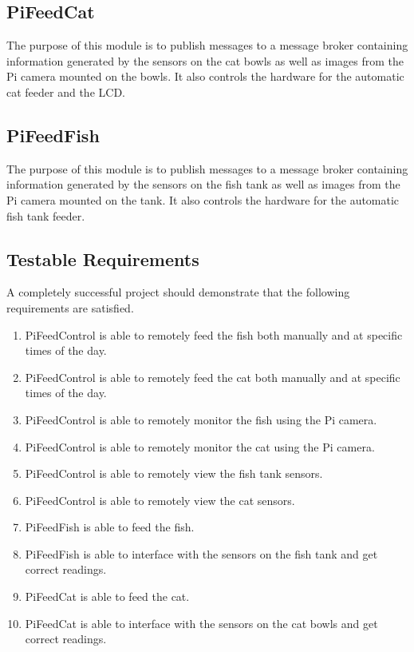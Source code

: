 \subsection{PiFeedCat}
The purpose of this module is to publish messages to a message broker containing
information generated by the sensors on the cat bowls as well as images from the
Pi camera mounted on the bowls. It also controls the hardware for the automatic
cat feeder and the LCD.

\subsection{PiFeedFish}
The purpose of this module is to publish messages to a message broker containing
information generated by the sensors on the fish tank as well as images from the
Pi camera mounted on the tank. It also controls the hardware for the automatic
fish tank feeder.

\subsection{Testable Requirements}
A completely successful project should demonstrate that the following requirements
are satisfied.
\begin{enumerate}
    \item PiFeedControl is able to remotely feed the fish both manually and at
          specific times of the day.
    \item PiFeedControl is able to remotely feed the cat both manually and at
          specific times of the day.
    \item PiFeedControl is able to remotely monitor the fish using the Pi camera.
    \item PiFeedControl is able to remotely monitor the cat using the Pi camera.
    \item PiFeedControl is able to remotely view the fish tank sensors.
    \item PiFeedControl is able to remotely view the cat sensors.
    \item PiFeedFish is able to feed the fish.
    \item PiFeedFish is able to interface with the sensors on the fish tank and
          get correct readings.
    \item PiFeedCat is able to feed the cat.
    \item PiFeedCat is able to interface with the sensors on the cat bowls and
          get correct readings.
\end{enumerate}

